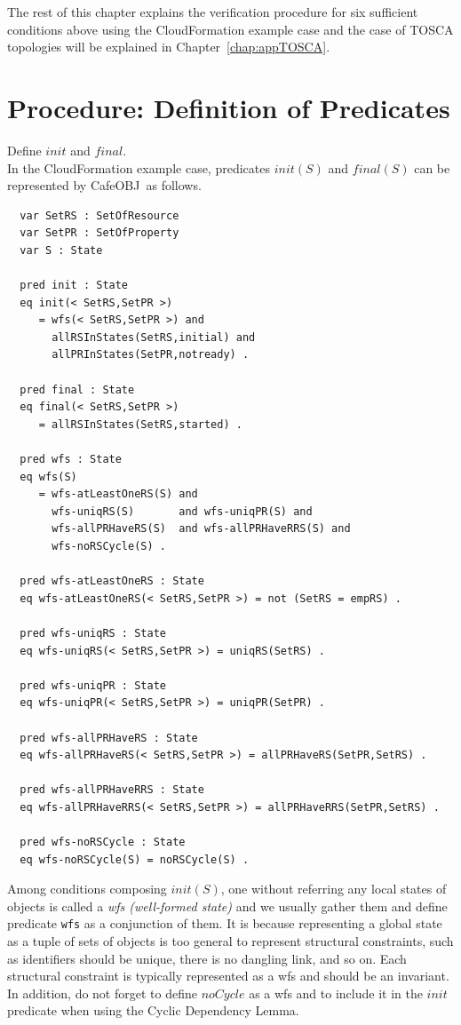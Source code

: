 \documentclass[12pt]{report}
\newcommand{\cafeobj}{{\sf CafeOBJ}~}
\begin{document}
The rest of this chapter explains the verification procedure for six
sufficient conditions above using the CloudFormation example case and
the case of TOSCA topologies will be explained in
Chapter~\ref{chap:appTOSCA}.

\section{Procedure: Definition of Predicates}
\label{sec:support}
 Define $init$ and $final$. \\ In the
CloudFormation example case, predicates $init(S)$ and $final(S)$ can
be represented by \cafeobj as follows.
\begin{verbatim}
  var SetRS : SetOfResource
  var SetPR : SetOfProperty
  var S : State

  pred init : State
  eq init(< SetRS,SetPR >)
     = wfs(< SetRS,SetPR >) and
       allRSInStates(SetRS,initial) and 
       allPRInStates(SetPR,notready) .

  pred final : State
  eq final(< SetRS,SetPR >)
     = allRSInStates(SetRS,started) .

  pred wfs : State
  eq wfs(S)
     = wfs-atLeastOneRS(S) and
       wfs-uniqRS(S)       and wfs-uniqPR(S) and 
       wfs-allPRHaveRS(S)  and wfs-allPRHaveRRS(S) and
       wfs-noRSCycle(S) .

  pred wfs-atLeastOneRS : State
  eq wfs-atLeastOneRS(< SetRS,SetPR >) = not (SetRS = empRS) .

  pred wfs-uniqRS : State
  eq wfs-uniqRS(< SetRS,SetPR >) = uniqRS(SetRS) .

  pred wfs-uniqPR : State
  eq wfs-uniqPR(< SetRS,SetPR >) = uniqPR(SetPR) .

  pred wfs-allPRHaveRS : State
  eq wfs-allPRHaveRS(< SetRS,SetPR >) = allPRHaveRS(SetPR,SetRS) .

  pred wfs-allPRHaveRRS : State
  eq wfs-allPRHaveRRS(< SetRS,SetPR >) = allPRHaveRRS(SetPR,SetRS) .

  pred wfs-noRSCycle : State
  eq wfs-noRSCycle(S) = noRSCycle(S) .
\end{verbatim}
Among conditions composing $init(S)$, one without referring any local
states of objects is called a {\it wfs (well-formed state)} and we
usually gather them and define predicate {\tt wfs} as a conjunction of
them. It is because representing a global state as a tuple of sets of
objects is too general to represent structural constraints, such as
identifiers should be unique, there is no dangling link, and so on. Each
structural constraint is typically represented as a wfs and should be
an invariant. In addition, do not forget to define $noCycle$ as a wfs
and to include it in the $init$ predicate when using the Cyclic
Dependency Lemma.\\
\end{document}
